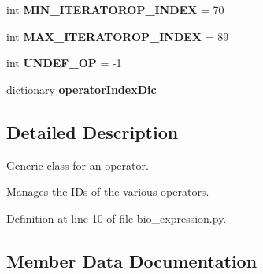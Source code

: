 \begin{DoxyCompactItemize}
\item 
int {\bfseries M\+I\+N\+\_\+\+I\+T\+E\+R\+A\+T\+O\+R\+O\+P\+\_\+\+I\+N\+D\+EX} = 70\hypertarget{classbio__expression_1_1_operator_a0dd404dd529039f3cea746b7e87438e1}{}\label{classbio__expression_1_1_operator_a0dd404dd529039f3cea746b7e87438e1}

\item 
int {\bfseries M\+A\+X\+\_\+\+I\+T\+E\+R\+A\+T\+O\+R\+O\+P\+\_\+\+I\+N\+D\+EX} = 89\hypertarget{classbio__expression_1_1_operator_a8cf931344da7c909e67faa669a95e2c5}{}\label{classbio__expression_1_1_operator_a8cf931344da7c909e67faa669a95e2c5}

\item 
int {\bfseries U\+N\+D\+E\+F\+\_\+\+OP} = -\/1\hypertarget{classbio__expression_1_1_operator_ab57f80edbd4390898e69f9222be629e1}{}\label{classbio__expression_1_1_operator_ab57f80edbd4390898e69f9222be629e1}

\item 
dictionary {\bfseries operator\+Index\+Dic}
\end{DoxyCompactItemize}


\subsection{Detailed Description}
Generic class for an operator. 

Manages the I\+Ds of the various operators. 

Definition at line 10 of file bio\+\_\+expression.\+py.



\subsection{Member Data Documentation}
